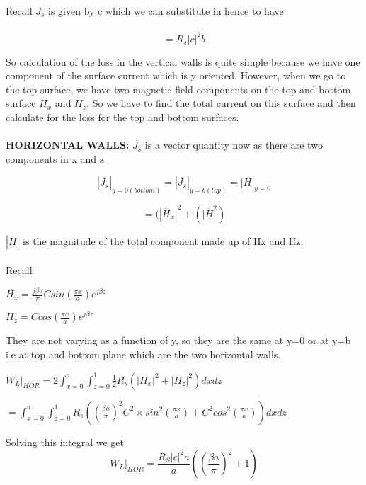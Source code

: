 Recall $\overline{J_s}$ is given by c which we can substitute  in hence to have\\\\
\begin{equation}
=R_s|c|^2b
\end{equation}



So calculation  of the loss in the vertical walls is quite simple because we have one component of the surface current which is y oriented. 
However, when we go to the top surface, we have two magnetic field components on the top and bottom surface $H_x$ and $H_z$. So we have to find the total current on this surface and then calculate for the loss for the top and bottom  surfaces.\\\\
\textbf{HORIZONTAL WALLS:} $\overline{J_s}$ is a vector  quantity  now as there are two  components in x and z
\begin{center}
	$$|\overline{J_s}|_{y=0(bottom)} = |\overline{J_s}|_{y=b(top)} = |H|_{y=0}$$
	
	$$=(|\overline{H}_x|^2 + (|\overline{H}^2 )$$	
\end{center}



$|\overline{H}|$ is the magnitude  of the total component made up of Hx and Hz.\\\\

Recall

\begin{center}
	$\overline{H_x} = \frac{j\beta a}{\pi}Csin(\frac{\pi x}{a})e^{j\beta z}$
\end{center}
\begin{center}
	$H_z=Ccos(\frac{\pi x}{a})e^{j\beta z}$
\end{center}


They are not varying as a function of y, so they are the same at y=0 or at y=b i.e at top and bottom  plane which are the two horizontal walls.
\begin{center}
	$W_L|_{HOR} = 2\int_{x=0}^{a}\int_{z=0}^{1}\frac{1}{2}R_s(|H_x|^2 + |H_z|^2)dxdz$
\end{center}
\begin{center}
	$=\int_{x=0}^{a}\int_{z=0}^{1}R_s ((\frac{\beta a}{\pi})^2C^2 \times sin^2(\frac{\pi x}{a})+ C^2cos^2(\frac{\pi x}{a}))dxdz$	
\end{center}



Solving  this integral we get
\begin{equation}
W_L|_{HOR} = \frac{R_S|c|^2 a}{a}\left(\left(\frac{\beta a}{\pi}\right)^2 +1\right)
\end{equation}



